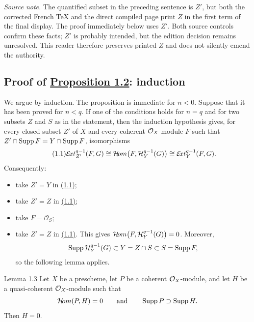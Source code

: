 \noindent\textit{Source note.} The quantified subset in the preceding
sentence is $Z'$, but both the corrected French TeX and the direct compiled
page print $Z$ in the first term of the final display. The proof immediately
below uses $Z'$. Both source controls confirm these facts; $Z'$ is probably
intended, but the edition decision remains unresolved. This reader therefore
preserves printed $Z$ and does not silently emend the authority.

\subsection*{Proof of \hyperref[VII.1.2]{Proposition 1.2}: induction}

We argue by induction. The proposition is immediate for $n<0$. Suppose that it
has been proved for $n<q$. If one of the conditions holds for $n=q$ and for two
subsets $Z$ and $S$ as in the statement, then the induction hypothesis gives,
for every closed subset $Z'$ of $X$ and every coherent $\mathcal O_X$-module $F$ such
that $Z'\cap\operatorname{Supp} F=Y\cap\operatorname{Supp} F$, isomorphisms
\begin{equation}\tag{1.1}\label{eq:VII.1.1}
  \mathcal E\!xt_{Z'}^{q-1}(F,G)
  \cong\mathcal H\!om\bigl(F,\mathcal H_Y^{q-1}(G)\bigr)
  \cong\mathcal E\!xt_Y^{q-1}(F,G).
\end{equation}
Consequently:
\begin{itemize}
  \item[(i)$\Rightarrow$(iv)] take $Z'=Y$ in \hyperref[eq:VII.1.1]{(1.1)};
  \item[(iv)$\Rightarrow$(iii)] take $Z'=Z$ in \hyperref[eq:VII.1.1]{(1.1)};
  \item[(iii)$\Rightarrow$(ii)] take $F=\mathcal O_S$;
  \item[(ii)$\Rightarrow$(i)] take $Z'=Z$ in \hyperref[eq:VII.1.1]{(1.1)}. This gives
  $\mathcal H\!om\bigl(F,\mathcal H_Y^{q-1}(G)\bigr)=0$. Moreover,
  \[
    \operatorname{Supp}\mathcal H_Y^{q-1}(G)
    \subset Y=Z\cap S\subset S=\operatorname{Supp} F,
  \]
  so the following lemma applies.
\end{itemize}

\begin{sgastatement}{Lemma 1.3}
Let $X$ be a prescheme, let $P$ be a coherent $\mathcal O_X$-module, and let $H$ be a
quasi-coherent $\mathcal O_X$-module such that
\[
  \mathcal H\!om(P,H)=0
  \qquad\text{and}\qquad
  \operatorname{Supp} P\supset\operatorname{Supp} H.
\]
Then $H=0$.
\end{sgastatement}

